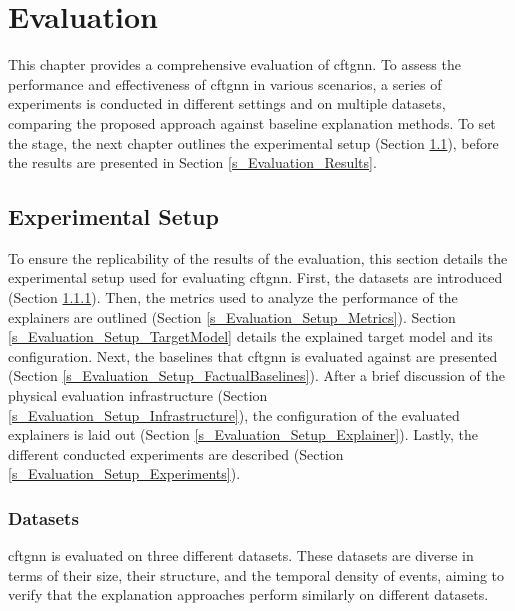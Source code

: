 \section{Evaluation}
\label{s_Evaluation}

This chapter provides a comprehensive evaluation of \gls{cftgnn}. To assess the performance and effectiveness of \gls{cftgnn} in various scenarios, a series of experiments is conducted in different settings and on multiple datasets, comparing the proposed approach against baseline explanation methods. To set the stage, the next chapter outlines the experimental setup (Section \ref{s_Evaluation_Setup}), before the results are presented in Section \ref{s_Evaluation_Results}.

\subsection{Experimental Setup}
\label{s_Evaluation_Setup}

To ensure the replicability of the results of the evaluation, this section details the experimental setup used for evaluating \gls{cftgnn}. First, the datasets are introduced (Section \ref{s_Evaluation_Setup_Datasets}). Then, the metrics used to analyze the performance of the explainers are outlined (Section \ref{s_Evaluation_Setup_Metrics}). Section \ref{s_Evaluation_Setup_TargetModel} details the explained target model and its configuration. Next, the baselines that \gls{cftgnn} is evaluated against are presented (Section \ref{s_Evaluation_Setup_FactualBaselines}). After a brief discussion of the physical evaluation infrastructure (Section \ref{s_Evaluation_Setup_Infrastructure}), the configuration of the evaluated explainers is laid out (Section \ref{s_Evaluation_Setup_Explainer}). Lastly, the different conducted experiments are described (Section \ref{s_Evaluation_Setup_Experiments}).

\subsubsection{Datasets}
\label{s_Evaluation_Setup_Datasets}

\gls{cftgnn} is evaluated on three different datasets. These datasets are diverse in terms of their size, their structure, and the temporal density of events, aiming to verify that the explanation approaches perform similarly on different datasets.

